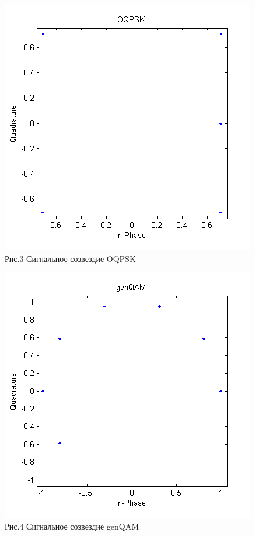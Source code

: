 \documentclass[a4paper]{article}
\begin{document}
\begin{center}
	\includegraphics[scale = 1]{OQPSK.png} \\Рис.3 Сигнальное созвездие OQPSK
\end{center}
\begin{center}
	\includegraphics[scale = 1]{genqam.png} \\Рис.4 Сигнальное созвездие genQAM
\end{center}
\end{document}
